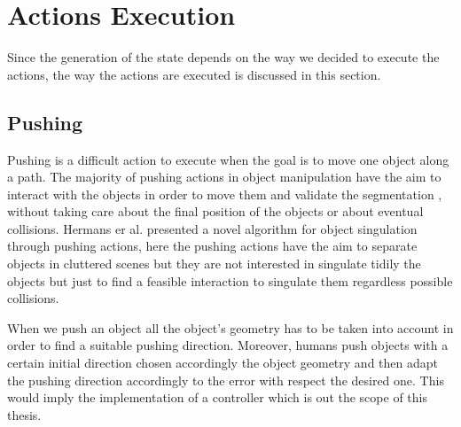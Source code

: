 


\section{Actions Execution}
Since the generation of the state depends on the way we decided to execute the actions, the way the actions are executed is discussed in this section.   

\subsection{Pushing}
\label{subsec:pushing}

Pushing is a difficult action to execute when the goal is to move one object along a path. The majority of pushing actions in object manipulation have the aim to interact with the objects in order to move them and validate the segmentation \citep{katz2014perceiving} \citep{katz2011interactive} \citep{Katz_2013_7407} , without taking care about the final position of the objects or about eventual collisions. Hermans er al. \citep{conf/iros/HermansRB12} presented a novel algorithm for object singulation through pushing actions, here the pushing actions have the aim to separate objects in cluttered scenes but they are not interested in singulate tidily the objects but just to find a feasible interaction to singulate them regardless possible collisions. 


When we push an object all the object's geometry has to be taken into account in order to find a suitable pushing direction. Moreover, humans push objects with a certain initial direction chosen accordingly the object geometry and then adapt the pushing direction accordingly to the error with respect the desired one. This would imply the implementation of a controller which is out the scope of this thesis. 

